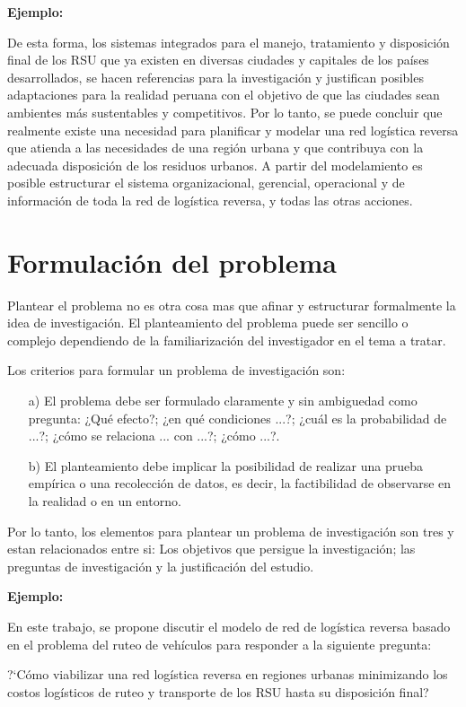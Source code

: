 {\bf Ejemplo:}\par

De esta forma, los sistemas integrados para el manejo, tratamiento y disposición final de los RSU que ya existen en diversas ciudades y capitales de los países desarrollados, se hacen referencias para la investigación y justifican posibles adaptaciones para la realidad peruana con el objetivo de que las ciudades sean ambientes más sustentables y competitivos.
\vskip 0.3cm
 Por lo tanto, se puede concluir que realmente existe una necesidad para planificar y modelar una red logística reversa que atienda a las necesidades de una región urbana y que contribuya con la adecuada disposición de los residuos urbanos. A partir del modelamiento es posible estructurar el sistema organizacional, gerencial, operacional y de información de toda la red  de logística reversa, y todas las otras acciones.


\section{Formulación del problema}
Plantear el problema no es otra cosa mas que afinar y estructurar formalmente la idea de investigación. El planteamiento del problema puede ser sencillo o complejo dependiendo de la familiarización del investigador en el tema a tratar.\par    
\vskip 0.3cm
Los criterios para formular un problema de investigación son:
\begin{enumerate}
\item[a)] El problema debe ser formulado claramente y sin ambiguedad como pregunta: ¿Qué efecto?; ¿en qué condiciones ...?; ¿cuál es la probabilidad de ...?; ¿cómo se relaciona ... con ...?; ¿cómo ...?.
\vskip 0.3cm
\item[b)] El planteamiento debe implicar la posibilidad de realizar una prueba empírica o una recolección de datos, es decir, la factibilidad de observarse en la realidad o en un entorno. 
\end{enumerate}
Por lo tanto, los elementos para plantear un problema de investigación son tres y estan relacionados entre si: Los objetivos que persigue la investigación; las preguntas de investigación y la justificación del estudio. \cite{Erica}
\vskip 0.3cm

{\bf Ejemplo:}\par

  En este trabajo, se propone discutir el modelo de red  de logística reversa basado en el problema del ruteo de vehículos para responder a la siguiente pregunta:
 \begin{center} 
     ?`Cómo viabilizar una red logística reversa en regiones urbanas minimizando los costos logísticos de ruteo y transporte de los RSU hasta su disposición final?
 \end{center}


